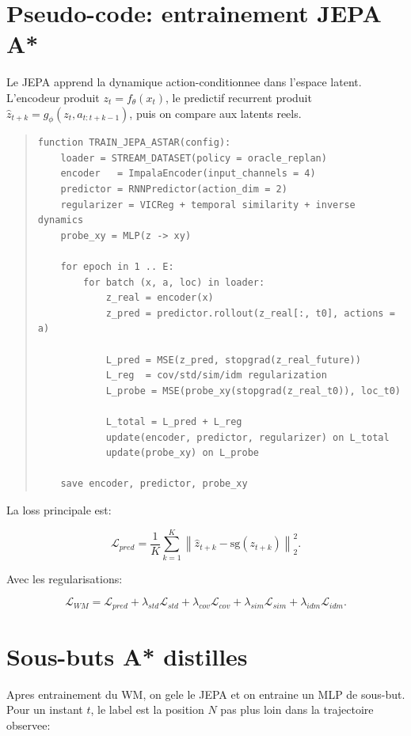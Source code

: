 \documentclass[11pt,a4paper]{article}
\begin{document}
\section{Pseudo-code: entrainement JEPA A*}

Le JEPA apprend la dynamique action-conditionnee dans l'espace latent. L'encodeur
produit \(z_t=f_\theta(x_t)\), le predictif recurrent produit
\(\hat z_{t+k}=g_\phi(z_t,a_{t:t+k-1})\), puis on compare aux latents reels.

\begin{quote}
\small
\begin{verbatim}
function TRAIN_JEPA_ASTAR(config):
    loader = STREAM_DATASET(policy = oracle_replan)
    encoder   = ImpalaEncoder(input_channels = 4)
    predictor = RNNPredictor(action_dim = 2)
    regularizer = VICReg + temporal similarity + inverse dynamics
    probe_xy = MLP(z -> xy)

    for epoch in 1 .. E:
        for batch (x, a, loc) in loader:
            z_real = encoder(x)
            z_pred = predictor.rollout(z_real[:, t0], actions = a)

            L_pred = MSE(z_pred, stopgrad(z_real_future))
            L_reg  = cov/std/sim/idm regularization
            L_probe = MSE(probe_xy(stopgrad(z_real_t0)), loc_t0)

            L_total = L_pred + L_reg
            update(encoder, predictor, regularizer) on L_total
            update(probe_xy) on L_probe

    save encoder, predictor, probe_xy
\end{verbatim}
\end{quote}

La loss principale est:

\[
  \mathcal{L}_{pred}
  = \frac{1}{K}\sum_{k=1}^{K}
    \left\|\hat z_{t+k}-\mathrm{sg}(z_{t+k})\right\|_2^2.
\]

Avec les regularisations:

\[
  \mathcal{L}_{WM}
  = \mathcal{L}_{pred}
  + \lambda_{std}\mathcal{L}_{std}
  + \lambda_{cov}\mathcal{L}_{cov}
  + \lambda_{sim}\mathcal{L}_{sim}
  + \lambda_{idm}\mathcal{L}_{idm}.
\]

\section{Sous-buts A* distilles}

Apres entrainement du WM, on gele le JEPA et on entraine un MLP de sous-but. Pour
un instant \(t\), le label est la position \(N\) pas plus loin dans la trajectoire
observee:
\end{document}
